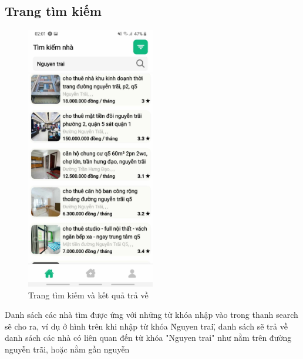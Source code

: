 \subsection{Trang tìm kiếm}
\begin{figure}[H]
    \centering
    \includegraphics[width=0.5\textwidth]{Images/app_image/app_7.jpg}
    \caption{Trang tìm kiếm và kết quả trả về}
\end{figure}
Danh sách các nhà tìm được ứng với những từ khóa nhập vào trong thanh search sẽ cho ra, ví dụ ở hình trên khi nhập từ khóa \"Nguyen trai\", danh sách sẽ trả về danh sách các nhà có liên quan đến từ khóa "Nguyen trai" như nằm trên đường nguyễn trãi, hoặc nằm gần nguyễn 

